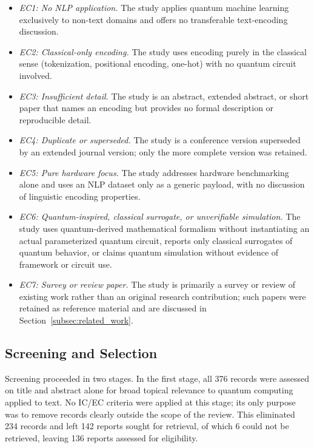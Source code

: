 \documentclass{ieeeaccess}
\begin{document}
\begin{itemize}
\item \textit{EC1: No NLP application.} The study applies quantum machine
  learning exclusively to non-text domains and offers no transferable
  text-encoding discussion.
\item \textit{EC2: Classical-only encoding.} The study uses encoding purely in
  the classical sense (tokenization, positional encoding, one-hot) with no
  quantum circuit involved.
\item \textit{EC3: Insufficient detail.} The study is an abstract, extended
  abstract, or short paper that names an encoding but provides no formal
  description or reproducible detail.
\item \textit{EC4: Duplicate or superseded.} The study is a conference version
  superseded by an extended journal version; only the more complete version
  was retained.
\item \textit{EC5: Pure hardware focus.} The study addresses hardware
  benchmarking alone and uses an NLP dataset only as a generic payload, with no
  discussion of linguistic encoding properties.
\item \textit{EC6: Quantum-inspired, classical surrogate, or unverifiable
  simulation.} The study uses quantum-derived mathematical formalism without
  instantiating an actual parameterized quantum circuit, reports only classical
  surrogates of quantum behavior, or claims quantum simulation without evidence
  of framework or circuit use.
\item \textit{EC7: Survey or review paper.} The study is primarily a survey or
  review of existing work rather than an original research contribution; such
  papers were retained as reference material and are discussed in
  Section~\ref{subsec:related_work}.
\end{itemize}

\subsection{Screening and Selection}
\label{subsec:screening}

Screening proceeded in two stages. In the first stage, all 376 records were
assessed on title and abstract alone for broad topical relevance to quantum
computing applied to text. No IC/EC criteria were applied at this stage; its
only purpose was to remove records clearly outside the scope of the review.
This eliminated 234 records and left 142 reports sought for retrieval, of which
6 could not be retrieved, leaving 136 reports assessed for eligibility.
\end{document}
